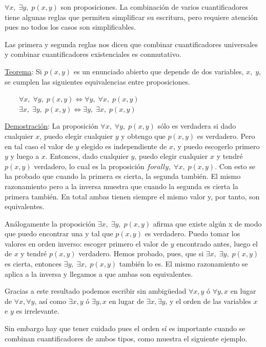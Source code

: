 \hspace{-7mm} $ \forall x, \; \exists y, \; p(x,y)$ son proposiciones. La combinación de varios cuantificadores tiene algunas reglas que permiten simplificar su escritura, pero requiere atención pues no todos los casos son simplificables.

Las primera y segunda reglas nos dicen que combinar cuantificadores universales y combinar cuantificadores existenciales es conmutativo.

\underline{Teorema}:  Si $p(x, y)$ es un enunciado abierto que depende de dos variables, $x,\; y$, se cumplen las siguientes equivalencias entre proposiciones.

$\qquad \forall x, \; \forall y, \; p(x,y) \Leftrightarrow
\forall y, \; \forall x, \; p(x,y) \qquad$
$\qquad \exists x, \; \exists y, \; p(x,y) \Leftrightarrow \exists y, \; \exists x, \; p(x,y)$


\underline{Demostración}: La proposición $\forall x, \; \forall y, \; p(x,y)$ sólo es verdadera si dado cualquier $x$, puedo elegir cualquier $y$ y obtengo que $p(x, y)$ es verdadero. Pero en tal caso el valor de $y$ elegido es independiente de $x$, y puedo escogerlo primero $y$ y luego a $x$. Entonces, dado cualquier $y$, puedo elegir cualquier $x$ y tendré $p(x, y)$ verdadero, lo cual es la proposición $forall y, \; \forall x, \; p(x,y)$. Con esto se ha probado que cuando la primera es cierta, la segunda también. El mismo razonamiento pero a la inversa muestra que cuando la segunda es cierta la primera también. En total ambas tienen siempre el mismo valor y, por tanto, son equivalentes.

Análogamente la proposición $\exists x, \; \exists y, \; p(x,y)$ afirma que existe algún x de modo que puedo encontrar una y tal que $p(x, y)$ es verdadero. Puedo tomar los valores en orden inverso: escoger primero el valor de $y$ encontrado antes, luego el de $x$ y tendré $p(x, y)$ verdadero. Hemos probado, pues, que si $\exists x, \; \exists y, \; p(x,y)$ es cierta, entonces $\exists y, \; \exists x, \; p(x,y)$ también lo es. El mismo razonamiento se aplica a la inversa y llegamos a que ambas son equivalentes. 

\rightline{$\Box$}

Gracias a este resultado podemos escribir sin ambigüedad $\forall x, y$  ó   $\forall y, x$ en lugar de $\forall x, \forall y$, así como $\exists x, y$ ó $\exists y, x$ en lugar de $\exists x , \exists y$, y el orden de las variables $x$ e $y$ es irrelevante.

Sin embargo hay que tener cuidado pues el orden sí es importante cuando se combinan cuantificadores de ambos tipos, como muestra el siguiente ejemplo.

